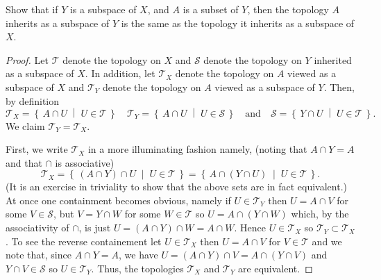 \begin{problem}[Munkres, \S16, 1.]
Show that if $Y$ is a subspace of $X$, and $A$ is a subset of
$Y$, then the topology $A$ inherits as a subspace of $Y$ is the
same as the topology it inherits as a subspace of $X$.
\end{problem}
\begin{proof}
Let $\mathcal{T}$ denote the topology on $X$ and $\mathcal{S}$
denote the topology on $Y$ inherited as a subspace of
$X$. In addition, let $\mathcal{T}_X$ denote the topology on $A$
viewed as a subspace of $X$ and $\mathcal{T}_Y$ denote the
topology on $A$ viewed as a subspace of $Y$. Then, by definition
\[
\mathcal{T}_X
=\left\{\,A\cap U\;\middle|\;U\in\mathcal{T}\,\right\}\quad
\mathcal{T}_Y
=\left\{\,A\cap U\;\middle|\;U\in\mathcal{S}\,\right\}\quad
\text{and}\quad
\mathcal{S}
=\left\{\,Y\cap U\;\middle|\;U\in\mathcal{T}\,\right\}.
\]
We claim $\mathcal{T}_Y=\mathcal{T}_X$.

First, we write $\mathcal{T}_X$ in a more illuminating fashion
namely, (noting that $A\cap Y=A$ and that $\cap$ is associative)
\[
\mathcal{T}_X
=\left\{\,(A\cap Y)\cap U\;\middle|\;U\in\mathcal{T}\,\right\}
=\left\{\,A\cap(Y\cap U)\;\middle|\;U\in\mathcal{T}\,\right\}.
\]
(It is an exercise in triviality to show that the above sets are
in fact equivalent.) At once one containment becomes obvious,
namely if $U\in\mathcal{T}_Y$ then $U=A\cap V$ for some
$V\in\mathcal{S}$, but $V=Y\cap W$ for some $W\in\mathcal{T}$ so
$U=A\cap(Y\cap W)$ which, by the associativity of $\cap$, is just
$U=(A\cap Y)\cap W=A\cap W$. Hence $U\in\mathcal{T}_X$ so
$\mathcal{T}_Y\subset\mathcal{T}_X$. To see the reverse
containement let $U\in\mathcal{T}_X$ then $U=A\cap V$ for
$V\in\mathcal{T}$ and we note that, since $A\cap Y=A$, we have
$U=(A\cap Y)\cap V=A\cap (Y\cap V)$ and $Y\cap V\in\mathcal{S}$
so $U\in\mathcal{T}_Y$. Thus, the topologies $\mathcal{T}_X$ and
$\mathcal{T}_Y$ are equivalent.
\end{proof}
\newpage

